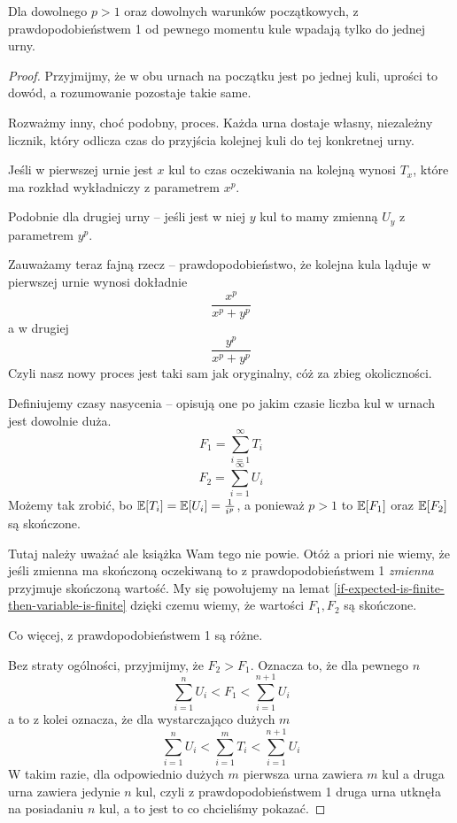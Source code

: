 \begin{theorem}
    Dla dowolnego \( p > 1 \) oraz dowolnych warunków początkowych, z prawdopodobieństwem 1 od pewnego momentu kule wpadają tylko do jednej urny.
\end{theorem}
\begin{proof}
    Przyjmijmy, że w obu urnach na początku jest po jednej kuli, uprości to dowód, a rozumowanie pozostaje takie same.
    
    Rozważmy inny, choć podobny, proces.
    Każda urna dostaje własny, niezależny licznik, który odlicza czas do przyjścia kolejnej kuli do tej konkretnej urny.
    
    Jeśli w pierwszej urnie jest \( x \) kul to czas oczekiwania na kolejną wynosi \( T_x \), które ma rozkład wykładniczy z parametrem \( x^p \).
    
    Podobnie dla drugiej urny -- jeśli jest w niej \( y \) kul to mamy zmienną \( U_y \) z parametrem \( y^p \).
    
    Zauważamy teraz fajną rzecz -- prawdopodobieństwo, że kolejna kula ląduje w pierwszej urnie wynosi dokładnie
    \[
         \frac{x^p}{x^p + y^p}
    \]
    a w drugiej
    \[
        \frac{y^p}{x^p + y^p}
    \]
    Czyli nasz nowy proces jest taki sam jak oryginalny, cóż za zbieg okoliczności.
    
    Definiujemy czasy nasycenia -- opisują one po jakim czasie liczba kul w urnach jest dowolnie duża.
    \[
        F_1 = \sum_{i=1}^\infty T_i
    \]
    \[
        F_2 = \sum_{i=1}^\infty U_i
    \]
    Możemy tak zrobić, bo \(\expected{T_i} = \expected{U_i} = \frac{1}{i^p}\), a ponieważ \( p > 1 \) to \( \expected{F_1}\) oraz \(\expected{F_2} \) są skończone.
    
    Tutaj należy uważać ale książka Wam tego nie powie.
    Otóż a priori nie wiemy, że jeśli zmienna ma skończoną oczekiwaną to z prawdopodobieństwem 1 \textit{zmienna} przyjmuje skończoną wartość.
    My się powołujemy na lemat \ref{if-expected-is-finite-then-variable-is-finite}
    dzięki czemu wiemy, że wartości \( F_1, F_2 \) są skończone.
    
    
    Co więcej, z prawdopodobieństwem 1 są różne.
    
    Bez straty ogólności, przyjmijmy, że \( F_2 > F_1 \). Oznacza to, że dla pewnego \( n \)
    \[
        \sum_{i=1}^n U_i < F_1 < \sum_{i=1}^{n+1} U_i
    \]
    a to z kolei oznacza, że dla wystarczająco dużych \( m \)
    \[
        \sum_{i=1}^n U_i < \sum_{i=1}^m T_i < \sum_{i=1}^{n+1} U_i
    \]
    W takim razie, dla odpowiednio dużych \( m \) pierwsza urna zawiera \( m \) kul a druga urna zawiera jedynie \( n \) kul, czyli z prawdopodobieństwem 1 druga urna utknęła na posiadaniu \( n \) kul, a to jest to co chcieliśmy pokazać.
\end{proof}

